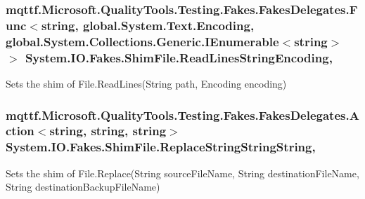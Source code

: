 \hypertarget{class_system_1_1_i_o_1_1_fakes_1_1_shim_file_aa0403490a92b6ac76d5011281467bbcc}{
\subsubsection[{Read\-Lines\-String\-Encoding}]{\setlength{\rightskip}{0pt plus 5cm}mqttf.\-Microsoft.\-Quality\-Tools.\-Testing.\-Fakes.\-Fakes\-Delegates.\-Func$<$string, global.\-System.\-Text.\-Encoding, global.\-System.\-Collections.\-Generic.\-I\-Enumerable$<$string$>$ $>$ System.\-I\-O.\-Fakes.\-Shim\-File.\-Read\-Lines\-String\-Encoding\hspace{0.3cm}{\ttfamily [static]}, {\ttfamily [set]}}}\label{class_system_1_1_i_o_1_1_fakes_1_1_shim_file_aa0403490a92b6ac76d5011281467bbcc}


Sets the shim of File.\-Read\-Lines(\-String path, Encoding encoding)

\hypertarget{class_system_1_1_i_o_1_1_fakes_1_1_shim_file_adf81aad01436972b674b4fb0671c6d64}{
\subsubsection[{Replace\-String\-String\-String}]{\setlength{\rightskip}{0pt plus 5cm}mqttf.\-Microsoft.\-Quality\-Tools.\-Testing.\-Fakes.\-Fakes\-Delegates.\-Action$<$string, string, string$>$ System.\-I\-O.\-Fakes.\-Shim\-File.\-Replace\-String\-String\-String\hspace{0.3cm}{\ttfamily [static]}, {\ttfamily [set]}}}\label{class_system_1_1_i_o_1_1_fakes_1_1_shim_file_adf81aad01436972b674b4fb0671c6d64}


Sets the shim of File.\-Replace(\-String source\-File\-Name, String destination\-File\-Name, String destination\-Backup\-File\-Name)

